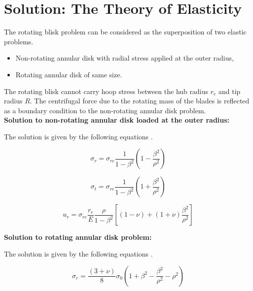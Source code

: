 \documentclass[12pt, a4paper, twoside]{article}
\begin{document}
\section{\sloppy Solution: The Theory of Elasticity}

The rotating blisk problem can be considered as the superposition of two elastic problems.

\begin{itemize}
	\item Non-rotating annular disk with radial stress applied at the outer radius,
	\item Rotating annular disk of same size.
\end{itemize}

The rotating blisk cannot carry hoop stress between the hub radius $r_e$ and tip radius $R$. The centrifugal force due to the rotating mass of the blades is reflected as a boundary condition to the non-rotating annular disk problem.\\

\noindent
\textbf{Solution to non-rotating annular disk loaded at the outer radius:}

The solution is given by the following equations \cite{rotors_book}.

\begin{equation}
	\label{equation:nr_sigma_r}
	{{\sigma }_{r}}={{\sigma }_{re}}{\frac {1} {1-{{\beta }^{2}}}}\left ( {1-{\frac {{\beta }^{2}} {{\rho }^{2}}}} \right )
\end{equation}

\begin{equation}
	\label{equation:nr_sigma_t}
	{{\sigma }_{t}}={{\sigma }_{re}}{\frac {1} {1-{{\beta }^{2}}}}\left ( {1+{\frac {{\beta }^{2}} {{\rho }^{2}}}} \right )
\end{equation}

\begin{equation}
	\label{equation:nr_u_r}
	{{u}_{r}}={{\sigma }_{re}}{\frac {{r}_{e}} {E}}{\frac {\rho } {1-{{\beta }^{2}}}}\left [ {\left ( {1-{\nu }} \right )+\left ( {1+{\nu }} \right ){\frac {{\beta }^{2}} {{\rho }^{2}}}} \right ]
\end{equation}

\noindent
\textbf{Solution to rotating annular disk problem:}


The solution is given by the following equations \cite{rotors_book}.

\begin{equation}
	\label{equation:r_sigma_r}
	{{\sigma }_{r}={\frac {(3+{\nu })} {8}{{\sigma }_{0}}}\left ( {1+{{\beta }^{2}}-{\frac {{\beta }^{2}} {{\rho }^{2}}-{\rho }^{2}}} \right )}
\end{equation}
\end{document}
